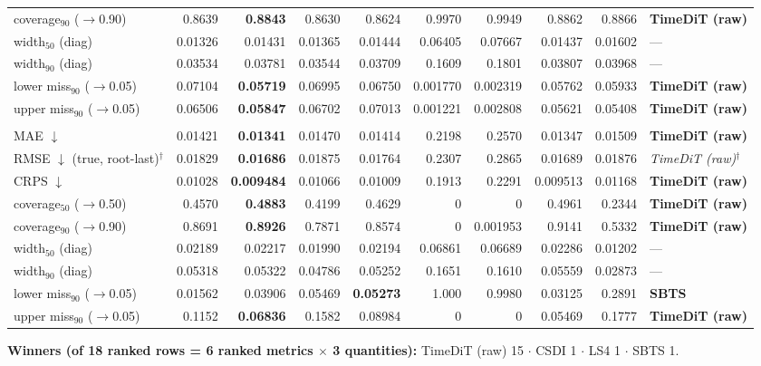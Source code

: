 \documentclass[11pt,a4paper]{article}
\begin{document}
\begin{landscape}
\begin{center}
\begin{tabular}{lrrrrrrrrl}
coverage$_{90}$ ($\to$0.90) & 0.8639 & \textbf{0.8843} & 0.8630 & 0.8624 & 0.9970 & 0.9949 & 0.8862 & 0.8866 & \textbf{TimeDiT (raw)} \\
width$_{50}$ (diag) & 0.01326 & 0.01431 & 0.01365 & 0.01444 & 0.06405 & 0.07667 & 0.01437 & 0.01602 & --- \\
width$_{90}$ (diag) & 0.03534 & 0.03781 & 0.03544 & 0.03709 & 0.1609 & 0.1801 & 0.03807 & 0.03968 & --- \\
lower miss$_{90}$ ($\to$0.05) & 0.07104 & \textbf{0.05719} & 0.06995 & 0.06750 & 0.001770 & 0.002319 & 0.05762 & 0.05933 & \textbf{TimeDiT (raw)} \\
upper miss$_{90}$ ($\to$0.05) & 0.06506 & \textbf{0.05847} & 0.06702 & 0.07013 & 0.001221 & 0.002808 & 0.05621 & 0.05408 & \textbf{TimeDiT (raw)} \\
\addlinespace
\multicolumn{10}{l}{\textbf{rv ($M$ scalar)}} \\
MAE $\downarrow$ & 0.01421 & \textbf{0.01341} & 0.01470 & 0.01414 & 0.2198 & 0.2570 & 0.01347 & 0.01509 & \textbf{TimeDiT (raw)} \\
RMSE $\downarrow$ (true, root-last)$^{\dagger}$ & 0.01829 & \textbf{0.01686} & 0.01875 & 0.01764 & 0.2307 & 0.2865 & 0.01689 & 0.01876 & \textit{TimeDiT (raw)}$^{\dagger}$ \\
CRPS $\downarrow$ & 0.01028 & \textbf{0.009484} & 0.01066 & 0.01009 & 0.1913 & 0.2291 & 0.009513 & 0.01168 & \textbf{TimeDiT (raw)} \\
coverage$_{50}$ ($\to$0.50) & 0.4570 & \textbf{0.4883} & 0.4199 & 0.4629 & 0 & 0 & 0.4961 & 0.2344 & \textbf{TimeDiT (raw)} \\
coverage$_{90}$ ($\to$0.90) & 0.8691 & \textbf{0.8926} & 0.7871 & 0.8574 & 0 & 0.001953 & 0.9141 & 0.5332 & \textbf{TimeDiT (raw)} \\
width$_{50}$ (diag) & 0.02189 & 0.02217 & 0.01990 & 0.02194 & 0.06861 & 0.06689 & 0.02286 & 0.01202 & --- \\
width$_{90}$ (diag) & 0.05318 & 0.05322 & 0.04786 & 0.05252 & 0.1651 & 0.1610 & 0.05559 & 0.02873 & --- \\
lower miss$_{90}$ ($\to$0.05) & 0.01562 & 0.03906 & 0.05469 & \textbf{0.05273} & 1.000 & 0.9980 & 0.03125 & 0.2891 & \textbf{SBTS} \\
upper miss$_{90}$ ($\to$0.05) & 0.1152 & \textbf{0.06836} & 0.1582 & 0.08984 & 0 & 0 & 0.05469 & 0.1777 & \textbf{TimeDiT (raw)} \\
\bottomrule
\end{tabular}
\end{center}
\noindent\textbf{Winners (of 18 ranked rows = 6 ranked metrics $\times$ 3 quantities):} TimeDiT (raw) 15 $\cdot$ CSDI 1 $\cdot$ LS4 1 $\cdot$ SBTS 1.
\end{landscape}
\end{document}
